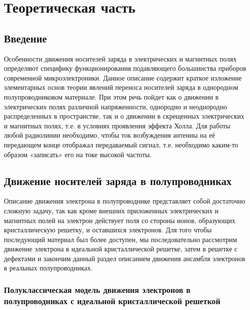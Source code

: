 
\usepackage{gensymb}
\usepackage{textcomp}
\usepackage{mathrsfs}

\def\labauthors{Карусевич А.А, Понур К.А.}
\def\labgroup{430}
\def\department{Кафедра квантовой физики}
\def\labnumber{1}
\def\labtheme{Движение носителей заряда в электрических и магнитных полях}

\renewcommand{\phi}{\varphi}

\def\E{\mathscr{E}_H}
\def\Rdim{\,\frac{\text{м}^3}{\text{А} \cdot \text{с}}}

\tableofcontents
\newpage
\section{Теоретическая часть}
\subsection*{Введение}
	Особенности движения носителей заряда в электрических и магнитных
полях определяют специфику функционирования подавляющего большинства
приборов современной микроэлектроники. Данное описание содержит краткое
изложение элементарных основ теории явлений переноса носителей заряда в 
однородном полупроводниковом материале. При этом речь пойдет как о движении
в электрических полях различной напряженности, однородно и неоднородно
распределенных в пространстве, так и о движении в скрещенных электрических
и магнитных полях, т.е. в условиях проявления эффекта Холла.
Для работы любой радиолинии необходимо, чтобы ток возбуждения антенны на её передающем конце отображал передаваемый сигнал, т.е. необходимо каким-то образом «записать» его на токе высокой частоты.



\subsection{Движение носителей заряда в полупроводниках}
Описание движения электрона в полупроводнике представляет собой достаточно сложную задачу, так как кроме внешних приложенных электрических и
магнитных полей на электрон действует поля со стороны ионов, образующих
кристаллическую решетку, и оставшихся электронов. Для того чтобы последующий материал был более доступен, мы последовательно рассмотрим движение
электрона в идеальной кристаллической решетке, затем в решетке с дефектами и
закончим данный раздел описанием движения ансамбля электронов в реальных
полупроводниках.

\subsubsection{Полуклассическая модель движения электронов в полупроводниках с идеальной кристаллической решеткой}

